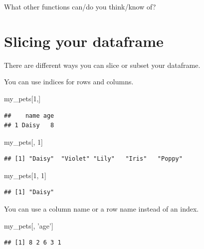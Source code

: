 \documentclass[
]{book}
\newenvironment{Shaded}{\begin{snugshade}}{\end{snugshade}}
\newcommand{\DecValTok}[1]{\textcolor[rgb]{0.00,0.00,0.81}{#1}}
\newcommand{\NormalTok}[1]{#1}
\newcommand{\StringTok}[1]{\textcolor[rgb]{0.31,0.60,0.02}{#1}}
\begin{document}
What other functions can/do you think/know of?

\hypertarget{slicing-your-dataframe}{%
\section{Slicing your dataframe}\label{slicing-your-dataframe}}

There are different ways you can slice or subset your dataframe.

You can use indices for rows and columns.

\begin{Shaded}
\begin{Highlighting}[]
\NormalTok{my_pets[}\DecValTok{1}\NormalTok{,]}
\end{Highlighting}
\end{Shaded}

\begin{verbatim}
##    name age
## 1 Daisy   8
\end{verbatim}

\begin{Shaded}
\begin{Highlighting}[]
\NormalTok{my_pets[, }\DecValTok{1}\NormalTok{]}
\end{Highlighting}
\end{Shaded}

\begin{verbatim}
## [1] "Daisy"  "Violet" "Lily"   "Iris"   "Poppy"
\end{verbatim}

\begin{Shaded}
\begin{Highlighting}[]
\NormalTok{my_pets[}\DecValTok{1}\NormalTok{, }\DecValTok{1}\NormalTok{]}
\end{Highlighting}
\end{Shaded}

\begin{verbatim}
## [1] "Daisy"
\end{verbatim}

You can use a column name or a row name instead of an index.

\begin{Shaded}
\begin{Highlighting}[]
\NormalTok{my_pets[, }\StringTok{'age'}\NormalTok{]}
\end{Highlighting}
\end{Shaded}

\begin{verbatim}
## [1] 8 2 6 3 1
\end{verbatim}
\end{document}
